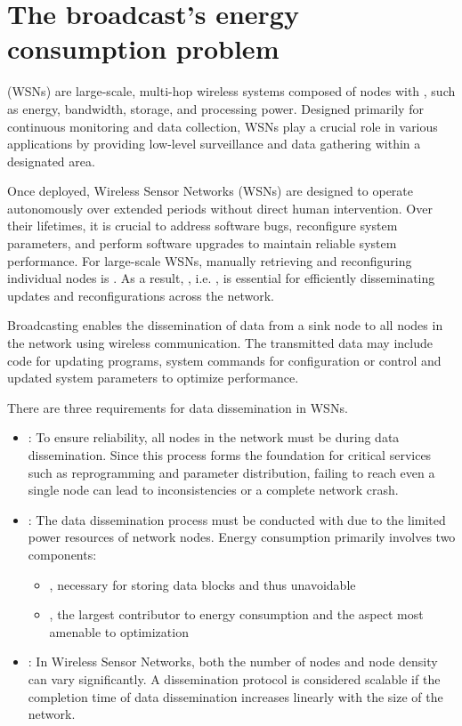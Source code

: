 \documentclass[a4paper, 12pt]{report}
\begin{document}
    \chapter{The broadcast's energy consumption problem}

     (WSNs) are large-scale, multi-hop wireless systems composed of nodes with , such as energy, bandwidth, storage, and processing power. Designed primarily for continuous monitoring and data collection, WSNs play a crucial role in various applications by providing low-level surveillance and data gathering within a designated area.

    Once deployed, Wireless Sensor Networks (WSNs) are designed to operate autonomously over extended periods without direct human intervention. Over their lifetimes, it is crucial to address software bugs, reconfigure system parameters, and perform software upgrades to maintain reliable system performance. For large-scale WSNs, manually retrieving and reconfiguring individual nodes is . As a result, , i.e. , is essential for efficiently disseminating updates and reconfigurations across the network.

    Broadcasting enables the dissemination of data from a sink node to all nodes in the network using wireless communication. The transmitted data may include code for updating programs, system commands for configuration or control and updated system parameters to optimize performance.

    There are three requirements for data dissemination in WSNs.

    \begin{itemize}
        \item {}: To ensure reliability, all nodes in the network must be  during data dissemination. Since this process forms the foundation for critical services such as reprogramming and parameter distribution, failing to reach even a single node can lead to inconsistencies or a complete network crash.
        \item {}: The data dissemination process must be conducted with  due to the limited power resources of network nodes. Energy consumption primarily involves two components:
            \begin{itemize}
                \item {}, necessary for storing data blocks and thus unavoidable
                \item {}, the largest contributor to energy consumption and the aspect most amenable to optimization
            \end{itemize}
        \item {}: In Wireless Sensor Networks, both the number of nodes and node density can vary significantly. A dissemination protocol is considered scalable if the completion time of data dissemination increases linearly with the size of the network.
    \end{itemize}
\end{document}
